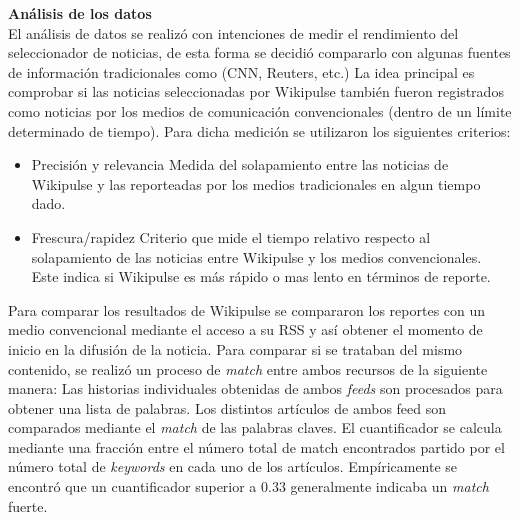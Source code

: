 \textbf{Análisis de los datos} \\
El análisis de datos se realizó con intenciones de medir el rendimiento del seleccionador de noticias, de esta forma se decidió compararlo con algunas fuentes de información tradicionales como (CNN, Reuters, etc.) La idea principal es comprobar si las noticias seleccionadas por Wikipulse también fueron registrados como noticias por los medios de comunicación convencionales (dentro de un límite determinado de tiempo). Para dicha medición se utilizaron los siguientes criterios:

\begin{itemize}
	\item Precisión y relevancia
	Medida del solapamiento entre las noticias de Wikipulse y las reporteadas por los medios tradicionales en algun tiempo dado.
	\item Frescura/rapidez
	Criterio que mide el tiempo relativo respecto al solapamiento de las noticias entre Wikipulse y los medios convencionales. Este indica si Wikipulse es más rápido o mas lento en términos de reporte.
\end{itemize}

Para comparar los resultados de Wikipulse se compararon los reportes con un medio convencional mediante el acceso a su RSS y así obtener el momento de inicio en la difusión de la noticia. Para comparar si se trataban del mismo contenido, se realizó un proceso de \emph{match} entre ambos recursos de la siguiente manera: Las historias individuales obtenidas de ambos \emph{feeds} son procesados para obtener una lista de palabras. Los distintos artículos de ambos feed son comparados mediante el \emph{match} de las palabras claves. El cuantificador se calcula mediante una fracción entre el número total de match encontrados partido por el número total de \emph{keywords} en cada uno de los artículos. Empíricamente se encontró que un cuantificador superior a 0.33 generalmente indicaba un \emph{match} fuerte.
